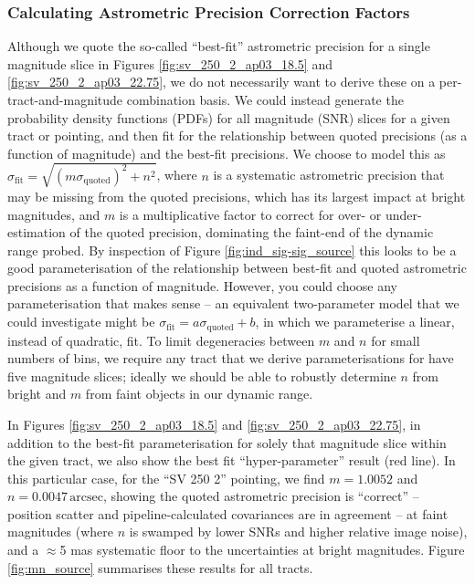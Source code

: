 \documentclass[SE,lsstdraft,authoryear,toc]{lsstdoc}
\begin{document}
\subsubsection{Calculating Astrometric Precision Correction Factors}
Although we quote the so-called ``best-fit'' astrometric precision for a single magnitude slice in Figures \ref{fig:sv_250_2_ap03_18.5} and \ref{fig:sv_250_2_ap03_22.75}, we do not necessarily want to derive these on a per-tract-and-magnitude combination basis.
We could instead generate the probability density functions (PDFs) for all magnitude (SNR) slices for a given tract or pointing, and then fit for the relationship between quoted precisions (as a function of magnitude) and the best-fit precisions.
We choose to model this as $\sigma_\mathrm{fit} = \sqrt{(m \sigma_\mathrm{quoted})^2 + n^2}$, where $n$ is a systematic astrometric precision that may be missing from the quoted precisions, which has its largest impact at bright magnitudes, and $m$ is a multiplicative factor to correct for over- or under-estimation of the quoted precision, dominating the faint-end of the dynamic range probed.
By inspection of Figure \ref{fig:ind_sig-sig_source} this looks to be a good parameterisation of the relationship between best-fit and quoted astrometric precisions as a function of magnitude.
However, you could choose any parameterisation that makes sense -- an equivalent two-parameter model that we could investigate might be $\sigma_\mathrm{fit} = a \sigma_\mathrm{quoted} + b$, in which we parameterise a linear, instead of quadratic, fit.
To limit degeneracies between $m$ and $n$ for small numbers of bins, we require any tract that we derive parameterisations for have five magnitude slices; ideally we should be able to robustly determine $n$ from bright and $m$ from faint objects in our dynamic range.

In Figures \ref{fig:sv_250_2_ap03_18.5} and \ref{fig:sv_250_2_ap03_22.75}, in addition to the best-fit parameterisation for solely that magnitude slice within the given tract, we also show the best fit ``hyper-parameter'' result (red line).
In this particular case, for the ``SV 250 2'' pointing, we find $m = 1.0052$ and $n = 0.0047\,\mathrm{arcsec}$, showing the quoted astrometric precision is ``correct'' -- position scatter and pipeline-calculated covariances are in agreement -- at faint magnitudes (where $n$ is swamped by lower SNRs and higher relative image noise), and a $\approx$5 mas systematic floor to the uncertainties at bright magnitudes.
Figure \ref{fig:mn_source} summarises these results for all tracts.
\end{document}
